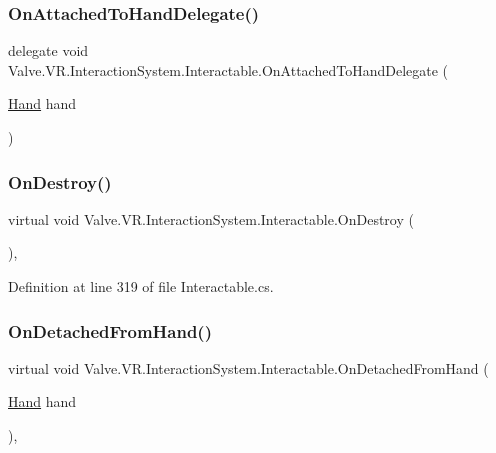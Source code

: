 \subsubsection{\texorpdfstring{OnAttachedToHandDelegate()}{OnAttachedToHandDelegate()}}
{\footnotesize\ttfamily delegate void Valve.\+V\+R.\+Interaction\+System.\+Interactable.\+On\+Attached\+To\+Hand\+Delegate (\begin{DoxyParamCaption}\item[{\mbox{\hyperlink{class_valve_1_1_v_r_1_1_interaction_system_1_1_hand}{Hand}}}]{hand }\end{DoxyParamCaption})}

\mbox{\label{class_valve_1_1_v_r_1_1_interaction_system_1_1_interactable_a229fd3f673c88a917fa40faa228e3b5f}} 
\subsubsection{\texorpdfstring{OnDestroy()}{OnDestroy()}}
{\footnotesize\ttfamily virtual void Valve.\+V\+R.\+Interaction\+System.\+Interactable.\+On\+Destroy (\begin{DoxyParamCaption}{ }\end{DoxyParamCaption})\hspace{0.3cm}{\ttfamily [protected]}, {\ttfamily [virtual]}}



Definition at line 319 of file Interactable.\+cs.

\mbox{\label{class_valve_1_1_v_r_1_1_interaction_system_1_1_interactable_af0c021201187d64f34c28122b6d39949}} 
\subsubsection{\texorpdfstring{OnDetachedFromHand()}{OnDetachedFromHand()}}
{\footnotesize\ttfamily virtual void Valve.\+V\+R.\+Interaction\+System.\+Interactable.\+On\+Detached\+From\+Hand (\begin{DoxyParamCaption}\item[{\mbox{\hyperlink{class_valve_1_1_v_r_1_1_interaction_system_1_1_hand}{Hand}}}]{hand }\end{DoxyParamCaption})\hspace{0.3cm}{\ttfamily [protected]}, {\ttfamily [virtual]}}



